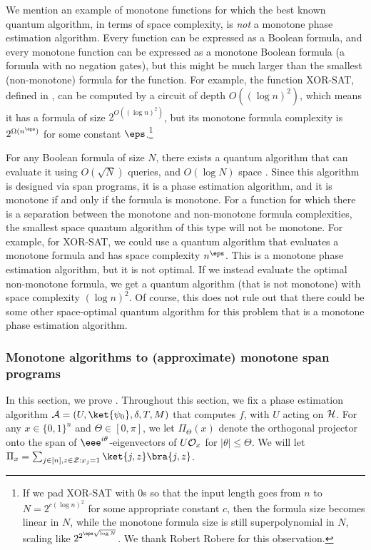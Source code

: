 \documentclass{toc}
\begin{document}
\begin{remark}\label{rem:non-monotone}
We mention an example of monotone functions for which the best known quantum algorithm, in terms of space complexity, is \emph{not} a monotone phase estimation algorithm. Every function can be expressed as a Boolean formula, and every monotone function can be expressed as a monotone Boolean formula (a formula with no negation gates), but this might be much larger than the smallest (non-monotone) formula for the function. For example, the function XOR-SAT, defined in \cite{GKRS18}, can be computed by a circuit of depth $O((\log n)^2)$, which means it has a formula of size $2^{O((\log n)^2)}$, but its monotone formula complexity is $2^{\Omega(n^{\eps})}$ for some constant $\eps$.\footnote{If we pad XOR-SAT with 0s so that the input length goes from $n$ to $N=2^{c(\log n)^2}$ for some appropriate constant $c$, then the formula size becomes linear in $N$, while the monotone formula size is still superpolynomial in $N$, scaling like $2^{2^{\eps\sqrt{\log N}}}$. We thank Robert Robere for this observation.} 

For any Boolean formula of size $N$, there exists a quantum algorithm that can evaluate it using $O(\sqrt{N})$ queries, and $O(\log N)$ space \cite{Rei09,JK16}. Since this algorithm is designed via span programs, it is a phase estimation algorithm, and it is monotone if and only if the formula is monotone. For a function for which there is a separation between the monotone and non-monotone formula complexities, the smallest space quantum algorithm of this type will not be monotone. For example, for XOR-SAT, we could use a quantum algorithm that evaluates a monotone formula and has space complexity $n^{\eps}$. This is a monotone phase estimation algorithm, but it is not optimal. If we instead evaluate the optimal non-monotone formula, we get a quantum algorithm (that is not monotone) with space complexity $(\log n)^2$. 
 Of course, this does not rule out that there could be some other space-optimal quantum algorithm for this problem that is a monotone phase estimation algorithm. 
\end{remark}

\subsubsection{Monotone algorithms to (approximate) monotone span programs}\label{sec:monotone-alg-to-span}

In this section, we prove .
Throughout this section, we fix a phase estimation algorithm ${\cal A}=(U,\ket{\psi_0},\delta,T,M)$ that computes $f$, with $U$ acting on ${\cal H}$. For any $x\in\{0,1\}^n$ and $\Theta\in [0,\pi]$, we let $\Pi_{\Theta}(x)$ denote the orthogonal projector onto the span of $\eee^{i\theta}$-eigenvectors of $U{\cal O}_x$ for $|\theta|\leq \Theta$. We will let $\Pi_x=\sum_{j\in [n],z\in{\cal Z}: x_j=1}\ket{j,z}\bra{j,z}$.
\end{document}
